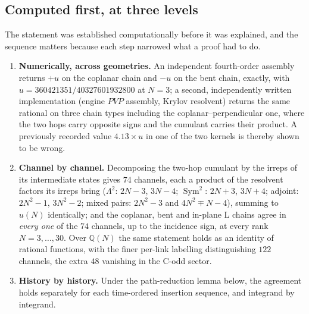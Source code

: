 \documentclass[11pt]{article}
\theoremstyle{definition}
\theoremstyle{remark}
\DeclareMathOperator{\Sym}{Sym}
\newcommand{\Q}{\mathbb{Q}}
\newcommand{\chk}[1]{}
\begin{document}
\subsection{Computed first, at three levels}

The statement was established computationally before it was explained, and the
sequence matters because each step narrowed what a proof had to do.

\begin{enumerate}\itemsep3pt
\item \textbf{Numerically, across geometries.} An independent fourth-order
  assembly returns $+u$ on the coplanar chain and $-u$ on the bent chain,
  exactly, with $u=360421351/40327601932800$ at $N=3$; a second, independently
  written implementation (engine $PVP$ assembly, Krylov resolvent) returns the
  same rational on three chain types including the coplanar--perpendicular one,
  where the two hops carry opposite signs and the cumulant carries their
  product. A previously recorded value $4.13\times u$ in one of the two kernels
  is thereby shown to be wrong.\chk{FINDING: the chain amplitude is u = X\_QUANTUM exactly, on the coplanar and the bent chain; the cold kernel's 4.13 u is wrong}
\item \textbf{Channel by channel.} Decomposing the two-hop cumulant by the
  irreps of its intermediate states gives $74$ channels, each a product of the
  resolvent factors its irreps bring ($\Lambda^2$: $2N-3$, $3N-4$; $\Sym^2$:
  $2N+3$, $3N+4$; adjoint: $2N^2-1$, $3N^2-2$; mixed pairs: $2N^2-3$ and
  $4N^2\mp N-4$), summing to $u(N)$ identically; and the coplanar, bent and
  in-plane L chains agree in \emph{every one} of the $74$ channels, up to the
  incidence sign, at every rank $N=3,\dots,30$. Over $\Q(N)$ the same
  statement holds as an identity of rational functions, with the finer
  per-link labelling distinguishing $122$ channels, the extra $48$ vanishing in
  the C-odd sector.\chk{u is universal channel by channel as an identity in Q(N): bent = -coplanar and L = coplanar in every C-odd channel and both equal it in every C-even channel, so u2 = 2u and the tier collapse D = -6u + 3u2 = 0 hold at every rank}
\item \textbf{History by history.} Under the path-reduction lemma below, the
  agreement holds separately for each time-ordered insertion sequence, and
  integrand by integrand.\chk{universality of the two-hop weight holds history by history: the straight and the L-shaped chain agree in every (insertion sequence, channel) term of the direct term, and integrand by integrand within each term}
\end{enumerate}
\end{document}
